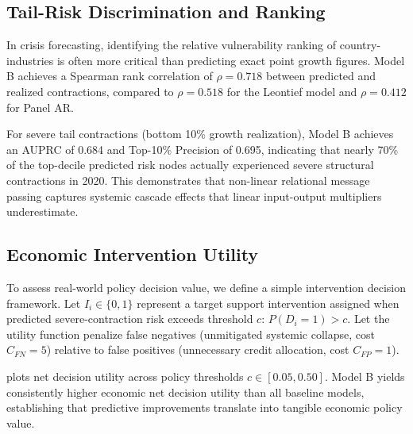 \documentclass[11pt,a4paper]{article}
\begin{document}
\subsection{Tail-Risk Discrimination and Ranking}

In crisis forecasting, identifying the relative vulnerability ranking of country-industries is often more critical than predicting exact point growth figures. Model B achieves a Spearman rank correlation of $\rho = 0.718$ between predicted and realized contractions, compared to $\rho = 0.518$ for the Leontief model and $\rho = 0.412$ for Panel AR.

For severe tail contractions (bottom 10\% growth realization), Model B achieves an AUPRC of 0.684 and Top-10\% Precision of 0.695, indicating that nearly 70\% of the top-decile predicted risk nodes actually experienced severe structural contractions in 2020. This demonstrates that non-linear relational message passing captures systemic cascade effects that linear input-output multipliers underestimate.

\subsection{Economic Intervention Utility}

To assess real-world policy decision value, we define a simple intervention decision framework. Let $I_i \in \{0, 1\}$ represent a target support intervention assigned when predicted severe-contraction risk exceeds threshold $c$: $P(D_i=1) > c$. Let the utility function penalize false negatives (unmitigated systemic collapse, cost $C_{FN} = 5$) relative to false positives (unnecessary credit allocation, cost $C_{FP} = 1$).

 plots net decision utility across policy thresholds $c \in [0.05, 0.50]$. Model B yields consistently higher economic net decision utility than all baseline models, establishing that predictive improvements translate into tangible economic policy value.
\end{document}
